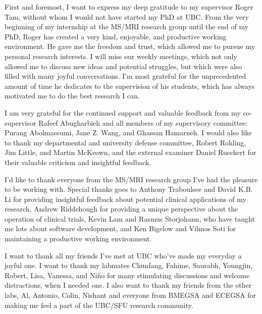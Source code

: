 





First and foremost, I want to express my deep gratitude to my supervisor Roger
Tam, without whom I would not have started my PhD at UBC. From the very
beginning of my internship at the MS/MRI research group until the end of my PhD,
Roger has created a very kind, enjoyable, and productive working environment. He
gave me the freedom and trust, which allowed me to pursue my personal research
interests. I will miss our weekly meetings, which not only allowed me to discuss
new ideas and potential struggles, but which were also filled with many joyful
conversations.  I'm most grateful for the unprecedented amount of time he
dedicates to the supervision of his students, which has always motivated me to
do the best research I can.

I am very grateful for the continued support and valuable feedback from my
co-supervisor Rafeef Abugharbieh and all members of my supervisory committee:
Purang Abolmaesumi, Jane Z. Wang,  and Ghassan Hamarneh. I would also like to
thank my departmental and university defense committee, Robert Rohling, Jim
Little, and Martin McKeown, and the external examiner Daniel Rueckert for their
valuable criticism and insightful feedback.

I'd like to thank everyone from the MS/MRI research group I've had the pleasure
to be working with. Special thanks goes to Anthony Traboulsee and David K.B. Li for
providing insightful feedback about potential clinical applications of my
research, Andrew Riddehough for providing a unique perspective about the
operation of clinical trials, Kevin Lam and Rasmus Storjohann, who have taught
me lots about software development, and Ken Bigelow and Vilmos Soti for
maintaining a productive working environment.

I want to thank all my friends I've met at UBC who've made my everyday a
joyful one. I want to thank my labmates Chunfang, Fahime, Saurabh, Youngjin,
Robert, Lisa, Vanessa, and Ni\~no for many stimulating discussions and welcome
distractions, when I needed one. I also want to thank my friends from the other
labs, Al, Antonio, Colin, Nishant and everyone from BMEGSA and ECEGSA for making
me feel a part of the UBC/SFU research community.

